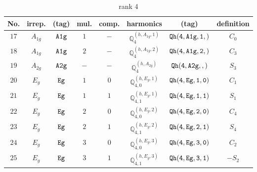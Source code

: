 \documentclass[fleqn,8pt]{jsarticle}
\begin{document}
\begin{table}[ht!]
\begin{center}
\caption{rank 4}
\renewcommand{\arraystretch}{1.3}
\begin{tabular}{cccccccc} \hline \hline
No. & irrep. & (tag) & mul. & comp. & harmonics & (tag) & definition \\ \hline
$ 17 $ & $ A_{1g} $ & $ {\tt A1g} $ & $ 1 $ & $ - $ & $ \mathbb{Q}_{4}^{(h,A_{1g},1)} $ & $ {\tt Qh(4,A1g,1,)} $ & $ C_{0} $ \\
$ 18 $ & $ A_{1g} $ & $ {\tt A1g} $ & $ 2 $ & $ - $ & $ \mathbb{Q}_{4}^{(h,A_{1g},2)} $ & $ {\tt Qh(4,A1g,2,)} $ & $ C_{3} $ \\
$ 19 $ & $ A_{2g} $ & $ {\tt A2g} $ & $ - $ & $ - $ & $ \mathbb{Q}_{4}^{(h,A_{2g})} $ & $ {\tt Qh(4,A2g,,)} $ & $ S_{3} $ \\
$ 20 $ & $ E_{g} $ & $ {\tt Eg} $ & $ 1 $ & $ 0 $ & $ \mathbb{Q}_{4,0}^{(h,E_{g},1)} $ & $ {\tt Qh(4,Eg,1,0)} $ & $ C_{1} $ \\
$ 21 $ & $ E_{g} $ & $ {\tt Eg} $ & $ 1 $ & $ 1 $ & $ \mathbb{Q}_{4,1}^{(h,E_{g},1)} $ & $ {\tt Qh(4,Eg,1,1)} $ & $ S_{1} $ \\
$ 22 $ & $ E_{g} $ & $ {\tt Eg} $ & $ 2 $ & $ 0 $ & $ \mathbb{Q}_{4,0}^{(h,E_{g},2)} $ & $ {\tt Qh(4,Eg,2,0)} $ & $ C_{4} $ \\
$ 23 $ & $ E_{g} $ & $ {\tt Eg} $ & $ 2 $ & $ 1 $ & $ \mathbb{Q}_{4,1}^{(h,E_{g},2)} $ & $ {\tt Qh(4,Eg,2,1)} $ & $ S_{4} $ \\
$ 24 $ & $ E_{g} $ & $ {\tt Eg} $ & $ 3 $ & $ 0 $ & $ \mathbb{Q}_{4,0}^{(h,E_{g},3)} $ & $ {\tt Qh(4,Eg,3,0)} $ & $ C_{2} $ \\
$ 25 $ & $ E_{g} $ & $ {\tt Eg} $ & $ 3 $ & $ 1 $ & $ \mathbb{Q}_{4,1}^{(h,E_{g},3)} $ & $ {\tt Qh(4,Eg,3,1)} $ & $ - S_{2} $ \\
 \hline \hline
\end{tabular}
\end{center}
\end{table}
\end{document}
